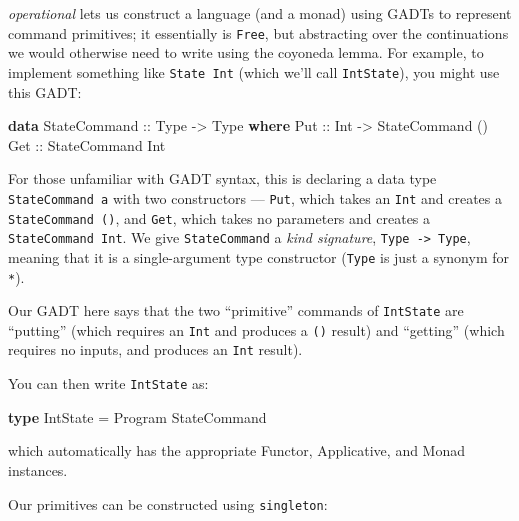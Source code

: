 \documentclass[]{article}
\newenvironment{Shaded}{}{}
\newcommand{\DataTypeTok}[1]{\textcolor[rgb]{0.56,0.13,0.00}{#1}}
\newcommand{\KeywordTok}[1]{\textcolor[rgb]{0.00,0.44,0.13}{\textbf{#1}}}
\newcommand{\NormalTok}[1]{#1}
\newcommand{\OtherTok}[1]{\textcolor[rgb]{0.00,0.44,0.13}{#1}}
\begin{document}
\emph{operational} lets us construct a language (and a monad) using GADTs to
represent command primitives; it essentially is \texttt{Free}, but abstracting
over the continuations we would otherwise need to write using the coyoneda
lemma. For example, to implement something like \texttt{State\ Int} (which we'll
call \texttt{IntState}), you might use this GADT:

\begin{Shaded}
\begin{Highlighting}[]
\KeywordTok{data} \DataTypeTok{StateCommand}\OtherTok{ ::} \DataTypeTok{Type} \OtherTok{{-}\textgreater{}} \DataTypeTok{Type} \KeywordTok{where}
    \DataTypeTok{Put}\OtherTok{ ::} \DataTypeTok{Int} \OtherTok{{-}\textgreater{}} \DataTypeTok{StateCommand}\NormalTok{ ()}
    \DataTypeTok{Get}\OtherTok{ ::} \DataTypeTok{StateCommand} \DataTypeTok{Int}
\end{Highlighting}
\end{Shaded}

For those unfamiliar with GADT syntax, this is declaring a data type
\texttt{StateCommand\ a} with two constructors --- \texttt{Put}, which takes an
\texttt{Int} and creates a \texttt{StateCommand\ ()}, and \texttt{Get}, which
takes no parameters and creates a \texttt{StateCommand\ Int}. We give
\texttt{StateCommand} a \emph{kind signature},
\texttt{Type\ -\textgreater{}\ Type}, meaning that it is a single-argument type
constructor (\texttt{Type} is just a synonym for \texttt{*}).

Our GADT here says that the two ``primitive'' commands of \texttt{IntState} are
``putting'' (which requires an \texttt{Int} and produces a \texttt{()} result)
and ``getting'' (which requires no inputs, and produces an \texttt{Int} result).

You can then write \texttt{IntState} as:

\begin{Shaded}
\begin{Highlighting}[]
\KeywordTok{type} \DataTypeTok{IntState} \OtherTok{=} \DataTypeTok{Program} \DataTypeTok{StateCommand}
\end{Highlighting}
\end{Shaded}

which automatically has the appropriate Functor, Applicative, and Monad
instances.

Our primitives can be constructed using \texttt{singleton}:
\end{document}
